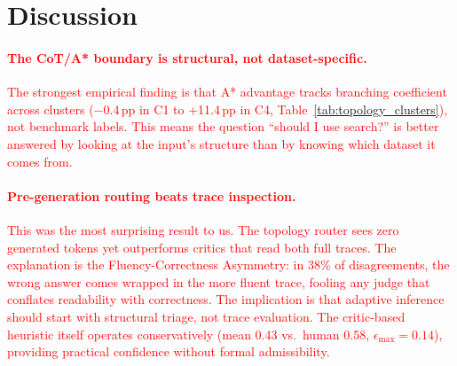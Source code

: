 \documentclass[11pt]{article}
\begin{document}

\section{Discussion}
\label{sec:discussion}


\textcolor{red}{\paragraph{The CoT/A* boundary is structural, not dataset-specific.}
The strongest empirical finding is that A* advantage tracks branching coefficient across clusters ($-$0.4\,pp in C1 to +11.4\,pp in C4, Table~\ref{tab:topology_clusters}), not benchmark labels. This means the question ``should I use search?'' is better answered by looking at the input's structure than by knowing which dataset it comes from.}

\textcolor{red}{\paragraph{Pre-generation routing beats trace inspection.}
This was the most surprising result to us. The topology router sees zero generated tokens yet outperforms critics that read both full traces. The explanation is the Fluency-Correctness Asymmetry: in 38\% of disagreements, the wrong answer comes wrapped in the more fluent trace, fooling any judge that conflates readability with correctness. The implication is that adaptive inference should start with structural triage, not trace evaluation. The critic-based heuristic itself operates conservatively (mean 0.43 vs.\ human 0.58, $\epsilon_{\max}=0.14$), providing practical confidence without formal admissibility.}
\end{document}
